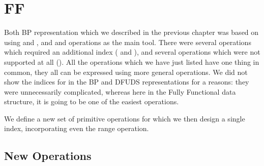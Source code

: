 \section{FF}

Both BP representation which we described in the previous chapter was based on using \rank{} and \select{}, and \match{} and \enclose{} operations as the main tool.
There were several operations which required an additional index (\childAny{} and \levelAncestor{}), and several operations which were not supported at all (\levelAny{}).
All the operations which we have just listed have one thing in common, they all can be expressed using more general operations.
We did not show the indices for \levelAncestor in the BP and DFUDS representations for a reasons: they were unnecessarily complicated, whereas here in the Fully Functional data structure, it is going to be one of the easiest operations.

We define a new set of primitive operations for which we then design a single index, incorporating even the range operation.

\subsection{New Operations}

